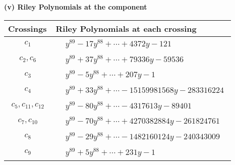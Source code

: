 \documentclass[1p]{elsarticle_modified}
\theoremstyle{definition}
\begin{document}
\newpage\renewcommand{\arraystretch}{1}
\flushleft \textbf{(v) Riley Polynomials at the component}\newline \\
\begin{tabular}{m{50pt}|m{274pt}}
Crossings & \hspace{64pt}Riley Polynomials at each crossing \\
\hline $$\begin{aligned}c_{1}\end{aligned}$$&$\begin{aligned}
&y^{89}-17 y^{88}+\cdots+4372 y-121
\end{aligned}$\\
\hline $$\begin{aligned}c_{2},c_{6}\end{aligned}$$&$\begin{aligned}
&y^{89}+37 y^{88}+\cdots+79336 y-59536
\end{aligned}$\\
\hline $$\begin{aligned}c_{3}\end{aligned}$$&$\begin{aligned}
&y^{89}-5 y^{88}+\cdots+207 y-1
\end{aligned}$\\
\hline $$\begin{aligned}c_{4}\end{aligned}$$&$\begin{aligned}
&y^{89}+33 y^{88}+\cdots-15159981568 y-283316224
\end{aligned}$\\
\hline $$\begin{aligned}c_{5},c_{11},c_{12}\end{aligned}$$&$\begin{aligned}
&y^{89}-80 y^{88}+\cdots-4317613 y-89401
\end{aligned}$\\
\hline $$\begin{aligned}c_{7},c_{10}\end{aligned}$$&$\begin{aligned}
&y^{89}-70 y^{88}+\cdots+4270382884 y-261824761
\end{aligned}$\\
\hline $$\begin{aligned}c_{8}\end{aligned}$$&$\begin{aligned}
&y^{89}-29 y^{88}+\cdots-1482160124 y-240343009
\end{aligned}$\\
\hline $$\begin{aligned}c_{9}\end{aligned}$$&$\begin{aligned}
&y^{89}+5 y^{88}+\cdots+231 y-1
\end{aligned}$\\
\hline
\end{tabular}\\~\\
\end{document}
